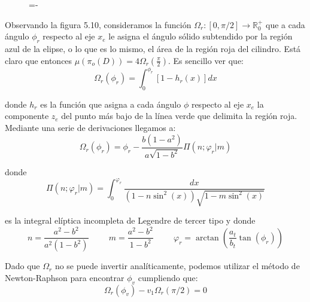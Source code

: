 \begin{figure}[h]
  \lineskip=-\fboxrule
\end{figure}

Observando la figura 5.10, consideramos la función $\Omega_r:[0,\pi /2]\rightarrow \mathds{R}_0^+$ que a cada ángulo $\phi_r$ respecto al eje $x_e$ le asigna el ángulo sólido subtendido por la región azul de la elipse, o lo que es lo mismo, el área de la región roja del cilindro. Está claro que entonces $\mu(\pi_o(D)) = 4\Omega_r(\frac{\pi}{2})$. Es sencillo ver que:
$$\Omega_r(\phi_r)=\int_0^{\phi_r}[1-h_r(x)] dx$$

donde $h_r$ es la función que asigna a cada ángulo $\phi$ respecto al eje $x_e$ la componente $z_e$ del punto más bajo de la línea verde que delimita la región roja. Mediante una serie de derivaciones llegamos a:
$$\Omega_r(\phi_r) = \phi_r -\frac{b(1-a^2)}{a\sqrt{1-b^2}}\Pi(n;\varphi_r|m) $$

donde
$$\Pi(n;\varphi_r|m) = \int_{0}^{\varphi_r}\frac{dx}{(1-n\sin^2(x))\sqrt{1-m\sin^2(x)}}$$

es la integral elíptica incompleta de Legendre de tercer tipo y donde
$$n = \frac{a^2-b^2}{a^2(1-b^2)}\hspace{1cm} m=\frac{a^2-b^2}{1-b^2} \hspace{1cm} \varphi_r=\arctan(\frac{a_t}{b_t}\tan(\phi_r))$$

Dado que $\Omega_r$ no se puede invertir analíticamente, podemos utilizar el método de Newton-Raphson para encontrar $\phi_v$ cumpliendo que:
$$\Omega_r(\phi_v)-v_1\Omega_r(\pi/2) = 0 $$


